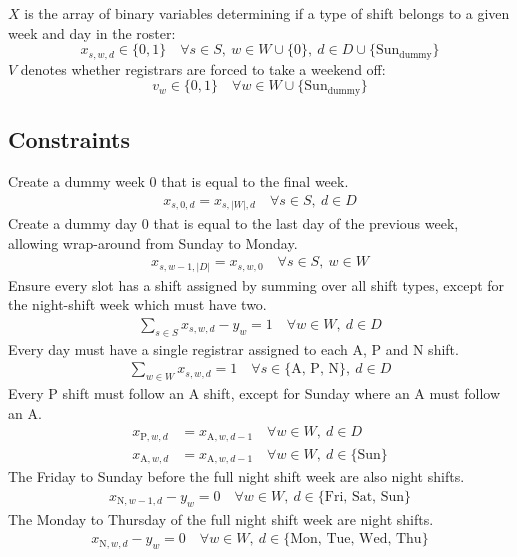 \documentclass[a4paper]{article}
\begin{document}
$X$ is the array of binary variables determining if a type of shift belongs to a given week and day in the roster:
$$x_{s, w, d} \in \{0, 1\} \quad\forall s\in S,\  w\in W \cup \{0\},\ d\in D \cup \{\text{Sun}_\text{dummy}\}$$
$V$ denotes whether registrars are forced to take a weekend off:
$$v_w \in \{0, 1\} \quad\forall w\in W \cup \{\text{Sun}_\text{dummy}\}$$

\subsection{Constraints}

Create a dummy week 0 that is equal to the final week.
\begin{align}
  x_{s, 0, d} = x_{s, |W|, d} \quad\forall s\in S,\ d\in D
\end{align}
Create a dummy day 0 that is equal to the last day of the previous week, allowing wrap-around from Sunday to Monday.
\begin{align}
  x_{s, w-1, |D|} = x_{s, w, 0} \quad\forall s\in S,\ w\in W
\end{align}
Ensure every slot has a shift assigned by summing over all shift types, except for the night-shift week which must have two.
\begin{align}
  \sum_{s\in S} x_{s, w, d} - y_w = 1 \quad\forall w\in W,\ d\in D
\end{align}
Every day must have a single registrar assigned to each A, P and N shift.
\begin{align}
  \sum_{w\in W} x_{s, w, d} = 1 \quad\forall s\in \{\text{A, P, N}\},\ d\in D
\end{align}
Every P shift must follow an A shift, except for Sunday where an A must follow an A.
\begin{align}
  x_{\text{P}, w, d} &= x_{\text{A}, w, d-1} \quad\forall w\in W,\ d\in D\\
  x_{\text{A}, w, d} &= x_{\text{A}, w, d-1} \quad\forall w\in W,\ d\in \{\text{Sun}\}
\end{align}
The Friday to Sunday before the full night shift week are also night shifts.
\begin{align}
  x_{\text{N}, w-1, d} - y_w = 0 \quad\forall w\in W,\ d\in \{\text{Fri, Sat, Sun}\}
\end{align}
The Monday to Thursday of the full night shift week are night shifts.
\begin{align}
  x_{\text{N}, w, d} - y_w = 0 \quad\forall w\in W,\ d\in \{\text{Mon, Tue, Wed, Thu}\}
\end{align}
\end{document}
